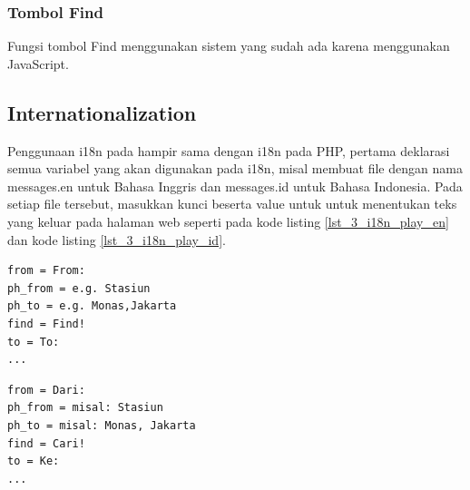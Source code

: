 \subsubsection{Tombol Find}
Fungsi tombol Find menggunakan sistem yang sudah ada karena menggunakan JavaScript.


\subsection{Internationalization}
Penggunaan i18n pada \play hampir sama dengan i18n pada PHP, pertama deklarasi semua variabel yang akan digunakan pada i18n, misal membuat file dengan nama messages.en untuk Bahasa Inggris dan messages.id untuk Bahasa Indonesia. Pada setiap file tersebut, masukkan kunci beserta value untuk untuk menentukan teks yang keluar pada halaman web seperti pada kode listing \ref{lst_3_i18n_play_en} dan kode listing \ref{lst_3_i18n_play_id}.

\begin{lstlisting}[caption=Script \play untuk Bahasa Inggris,label = {lst_3_i18n_play_en}]
from = From:
ph_from = e.g. Stasiun
ph_to = e.g. Monas,Jakarta
find = Find!
to = To:
...
\end{lstlisting}


\begin{lstlisting}[caption=Script \play untuk Bahasa Indonesia,label = {lst_3_i18n_play_id}]
from = Dari:
ph_from = misal: Stasiun
ph_to = misal: Monas, Jakarta
find = Cari!
to = Ke:
...
\end{lstlisting}

